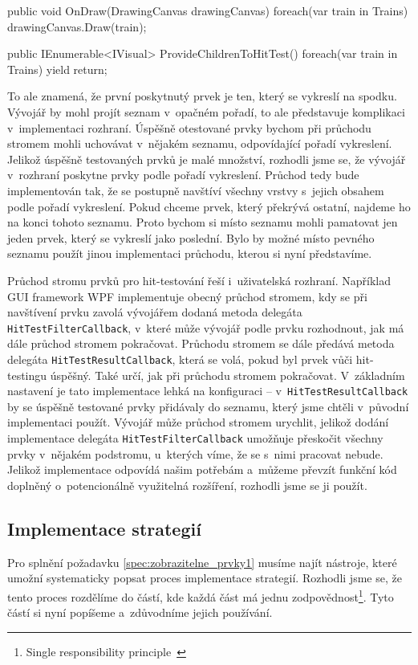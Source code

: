 \begin{csharpcode}
public void OnDraw(DrawingCanvas drawingCanvas) {
	foreach(var train in Trains) {
		drawingCanvas.Draw(train);	
	}
}

public IEnumerable<IVisual> ProvideChildrenToHitTest() {
	foreach(var train in Trains) {
		yield return;
	}
}
\end{csharpcode}

To ale znamená, že první poskytnutý prvek je ten, který se vykreslí na spodku. Vývojář by mohl projít seznam v~opačném pořadí, to ale představuje komplikaci v~implementaci rozhraní. Úspěšně otestované prvky bychom při průchodu stromem mohli uchovávat v~nějakém seznamu, odpovídající pořadí vykreslení. Jelikož úspěšně testovaných prvků je malé množství, rozhodli jsme se, že vývojář v~rozhraní poskytne prvky podle pořadí vykreslení. Průchod tedy bude implementován tak, že se postupně navštíví všechny vrstvy s~jejich obsahem podle pořadí vykreslení. Pokud chceme prvek, který překrývá ostatní, najdeme ho na konci tohoto seznamu. Proto bychom si místo seznamu mohli pamatovat jen jeden prvek, který se vykreslí jako poslední. Bylo by možné místo pevného seznamu použít jinou implementaci průchodu, kterou si nyní představíme.

Průchod stromu prvků pro hit-testování řeší i~uživatelská rozhraní. Například GUI framework WPF implementuje obecný průchod stromem, kdy se při navštívení prvku zavolá vývojářem dodaná metoda delegáta \texttt{HitTestFilterCallback}, v~které může vývojář podle prvku rozhodnout, jak má dále průchod stromem pokračovat. Průchodu stromem se dále předává metoda delegáta \linebreak \texttt{HitTestResultCallback}, která se volá, pokud byl prvek vůči hit-testingu \linebreak úspěšný. Také určí, jak při průchodu stromem pokračovat. V~základním nastavení je tato implementace lehká na konfiguraci -- v~\texttt{HitTestResultCallback} by se úspěšně testované prvky přidávaly do seznamu, který jsme chtěli v~původní implementaci použít.
Vývojář může průchod stromem urychlit, jelikož dodání implementace delegáta \texttt{HitTestFilterCallback} umožňuje přeskočit všechny prvky v~nějakém podstromu, u~kterých víme, že se s~nimi pracovat nebude. Jelikož implementace odpovídá našim potřebám a~můžeme převzít funkční kód doplněný o~potencionálně využitelná rozšíření, rozhodli jsme se ji použít.

\newpage
\subsection{Implementace strategií}
\label{kap3:implementace}
Pro splnění požadavku \ref{spec:zobrazitelne_prvky1} musíme najít nástroje, které umožní systematicky popsat proces implementace strategií. Rozhodli jsme se, že tento proces rozdělíme do částí, kde každá část má jednu zodpovědnost\footnote{Single responsibility principle~\cite{Martin:2003:ASD:515230}}. Tyto částí si nyní popíšeme a~zdůvodníme jejich používání.

